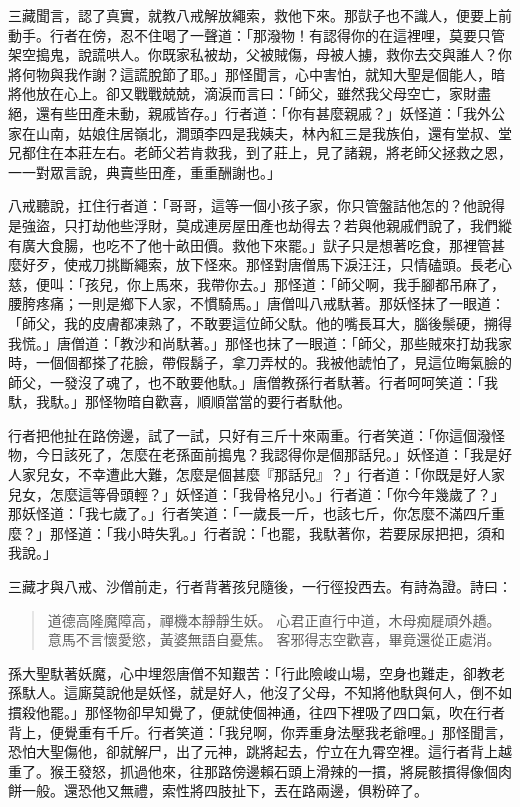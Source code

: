 三藏聞言，認了真實，就教八戒解放繩索，救他下來。那獃子也不識人，便要上前動手。行者在傍，忍不住喝了一聲道：「那潑物！有認得你的在這裡哩，莫要只管架空搗鬼，說謊哄人。你既家私被劫，父被賊傷，母被人擄，救你去交與誰人？你將何物與我作謝？這謊脫節了耶。」那怪聞言，心中害怕，就知大聖是個能人，暗將他放在心上。卻又戰戰兢兢，滴淚而言曰：「師父，雖然我父母空亡，家財盡絕，還有些田產未動，親戚皆存。」行者道：「你有甚麼親戚？」妖怪道：「我外公家在山南，姑娘住居嶺北，澗頭李四是我姨夫，林內紅三是我族伯，還有堂叔、堂兄都住在本莊左右。老師父若肯救我，到了莊上，見了諸親，將老師父拯救之恩，一一對眾言說，典賣些田產，重重酬謝也。」

八戒聽說，扛住行者道：「哥哥，這等一個小孩子家，你只管盤詰他怎的？他說得是強盜，只打劫他些浮財，莫成連房屋田產也劫得去？若與他親戚們說了，我們縱有廣大食腸，也吃不了他十畝田價。救他下來罷。」獃子只是想著吃食，那裡管甚麼好歹，使戒刀挑斷繩索，放下怪來。那怪對唐僧馬下淚汪汪，只情磕頭。長老心慈，便叫：「孩兒，你上馬來，我帶你去。」那怪道：「師父啊，我手腳都吊麻了，腰胯疼痛；一則是鄉下人家，不慣騎馬。」唐僧叫八戒馱著。那妖怪抹了一眼道：「師父，我的皮膚都凍熟了，不敢要這位師父馱。他的嘴長耳大，腦後鬃硬，搠得我慌。」唐僧道：「教沙和尚馱著。」那怪也抹了一眼道：「師父，那些賊來打劫我家時，一個個都搽了花臉，帶假鬍子，拿刀弄杖的。我被他諕怕了，見這位晦氣臉的師父，一發沒了魂了，也不敢要他馱。」唐僧教孫行者馱著。行者呵呵笑道：「我馱，我馱。」那怪物暗自歡喜，順順當當的要行者馱他。

行者把他扯在路傍邊，試了一試，只好有三斤十來兩重。行者笑道：「你這個潑怪物，今日該死了，怎麼在老孫面前搗鬼？我認得你是個那話兒。」妖怪道：「我是好人家兒女，不幸遭此大難，怎麼是個甚麼『那話兒』？」行者道：「你既是好人家兒女，怎麼這等骨頭輕？」妖怪道：「我骨格兒小。」行者道：「你今年幾歲了？」那妖怪道：「我七歲了。」行者笑道：「一歲長一斤，也該七斤，你怎麼不滿四斤重麼？」那怪道：「我小時失乳。」行者說：「也罷，我馱著你，若要尿尿把把，須和我說。」

三藏才與八戒、沙僧前走，行者背著孩兒隨後，一行徑投西去。有詩為證。詩曰：
\begin{quote}
道德高隆魔障高，禪機本靜靜生妖。
心君正直行中道，木母痴屣頑外趫。
意馬不言懷愛慾，黃婆無語自憂焦。
客邪得志空歡喜，畢竟還從正處消。
\end{quote}

孫大聖馱著妖魔，心中埋怨唐僧不知艱苦：「行此險峻山場，空身也難走，卻教老孫馱人。這廝莫說他是妖怪，就是好人，他沒了父母，不知將他馱與何人，倒不如摜殺他罷。」那怪物卻早知覺了，便就使個神通，往四下裡吸了四口氣，吹在行者背上，便覺重有千斤。行者笑道：「我兒啊，你弄重身法壓我老爺哩。」那怪聞言，恐怕大聖傷他，卻就解尸，出了元神，跳將起去，佇立在九霄空裡。這行者背上越重了。猴王發怒，抓過他來，往那路傍邊賴石頭上滑辣的一摜，將屍骸摜得像個肉餅一般。還恐他又無禮，索性將四肢扯下，丟在路兩邊，俱粉碎了。

